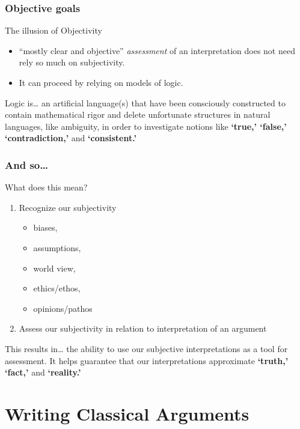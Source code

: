 \documentclass{beamer}
\begin{document}
\subsubsection{Objective goals}
\begin{frame}{The illusion of Objectivity}
\begin{itemize}
\item  ``mostly clear and objective'' \textsl{assessment} of an interpretation does not need rely so much on subjectivity. 
\item It can proceed by relying on models of logic.
\end{itemize}
\pause
\begin{block}{Logic is\ldots} 
an artificial language(s) that have been consciously constructed to contain mathematical rigor and delete unfortunate structures in natural languages, like ambiguity, in order to investigate notions like {\bf `true,' `false,' `contradiction,'} and {\bf `consistent.'}
\end{block}
\end{frame}

\subsubsection{And so\dots}
\begin{frame}{What does this mean?}
\begin{enumerate}
\item Recognize our subjectivity \begin{itemize} \item biases, \item assumptions, \item world view, \item ethics/ethos, \item opinions/pathos
\end{itemize}
\item Assess our subjectivity in relation to interpretation of an argument
\end{enumerate}
\begin{exampleblock}{This results in\dots}
\pause
the ability to use our subjective interpretations as a tool for assessment. It helps guarantee that our interpretations approximate {\bf `truth,' `fact,'} and {\bf `reality.'} 
\end{exampleblock}
\end{frame}


\section{Writing Classical Arguments}
\end{document}
